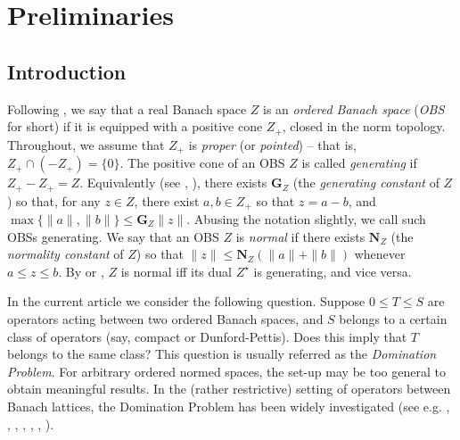 \documentclass[12pt]{amsart}
\theoremstyle{plain}
\theoremstyle{definition}
\renewcommand{\leq}{\leqslant}
\newcommand{\gen}{\mathbf{G}}
\newcommand{\nor}{\mathbf{N}}
\begin{document}
\section{Preliminaries}\label{sec:first}

\subsection{Introduction}\label{ss:intro}


Following \cite[Definition II.1.2]{Sch},
we say that a real Banach space $Z$ is an \emph{ordered Banach space}
(\emph{OBS} for short) if it is equipped with
a positive cone $Z_+$, closed in the norm topology. Throughout, we
assume that $Z_+$ is \emph{proper} (or \emph{pointed}) -- that is,
$Z_+ \cap (-Z_+) = \{0\}$.
The positive cone of an OBS $Z$ is called
\emph{generating} if $Z_+ - Z_+ = Z$. Equivalently (see \cite{An}, \cite{BR}),
there exists $\gen_Z$ (the \emph{generating constant} of $Z$) so that,
for any $z \in Z$, there exist $a, b \in Z_+$ so that $z = a - b$,
and $\max\{\|a\|, \|b\|\} \leq \gen_Z \|z\|$. Abusing the notation slightly,
we call such OBSs generating. %
We say that an OBS $Z$ is \emph{normal} %
if there exists $\nor_Z$ (the \emph{normality constant} of $Z$) so that
$\|z\| \leq \nor_Z (\|a\| + \|b\|)$ whenever $a \leq z \leq b$.
By \cite[Section 1.1]{BR} or \cite{An}, $Z$ is normal iff its dual $Z^\star$
is generating, and vice versa.

In the current article we consider the following question.
Suppose $0 \le T \le S$ are operators acting between two ordered
Banach spaces, and $S$ belongs to a certain class of operators (say, compact
or Dunford-Pettis). Does this imply that $T$ belongs to the same class?
This question is usually referred as the \emph{Domination Problem}.
For arbitrary ordered normed spaces, the set-up may be too general
to obtain meaningful results. In the (rather restrictive) setting
of operators between Banach lattices, the Domination Problem 
has been widely investigated (see e.g. \cite{AB:80},
\cite{AB:81}, \cite{DDFr}, \cite{Sp}, \cite{FHT}, \cite{KaSa}, \cite{Wi}).
\end{document}
